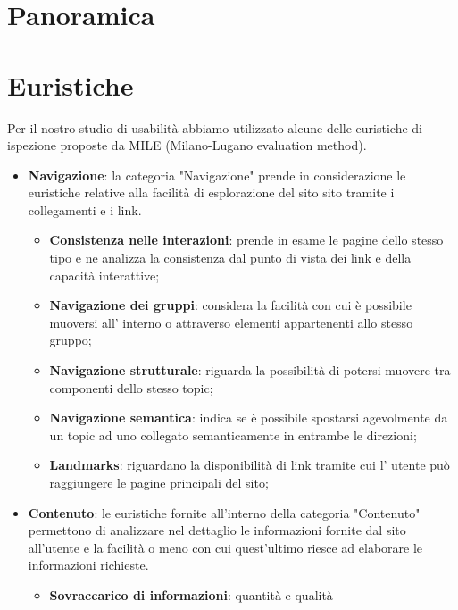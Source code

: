     \section{Panoramica}
    \section{Euristiche}
    Per il nostro studio di usabilità abbiamo utilizzato alcune delle euristiche
    di ispezione proposte da MILE (Milano-Lugano evaluation method).
    \begin{itemize}
        \item \textbf{Navigazione}: la categoria "Navigazione" prende in
        considerazione le euristiche relative alla facilità di esplorazione del sito
        sito tramite i collegamenti e i link.
        \begin{itemize}
            \item \textbf{Consistenza nelle interazioni}: prende in esame le
            pagine dello stesso tipo e ne analizza la consistenza dal punto
            di vista dei link e della capacità interattive;
            \item \textbf{Navigazione dei gruppi}: considera la facilità con
            cui è possibile muoversi all' interno o attraverso elementi
            appartenenti allo stesso gruppo;
            \item \textbf{Navigazione strutturale}: riguarda la possibilità
            di potersi muovere tra componenti dello stesso topic;
            \item \textbf{Navigazione semantica}: indica se è possibile
            spostarsi agevolmente da un topic ad uno collegato
            semanticamente in entrambe le direzioni;
            \item \textbf{Landmarks}: riguardano la disponibilità di link
            tramite cui l' utente può raggiungere le pagine principali del
            sito;
        \end{itemize}
        \item \textbf{Contenuto}: le euristiche fornite all'interno della categoria
        "Contenuto" permettono di analizzare nel dettaglio le informazioni fornite
        dal sito all'utente e la facilità o meno con cui quest'ultimo riesce ad 
        elaborare le informazioni richieste.
        \begin{itemize}
            \item \textbf{Sovraccarico di informazioni}: quantità e qualità

\end{itemize}
\end{itemize}
